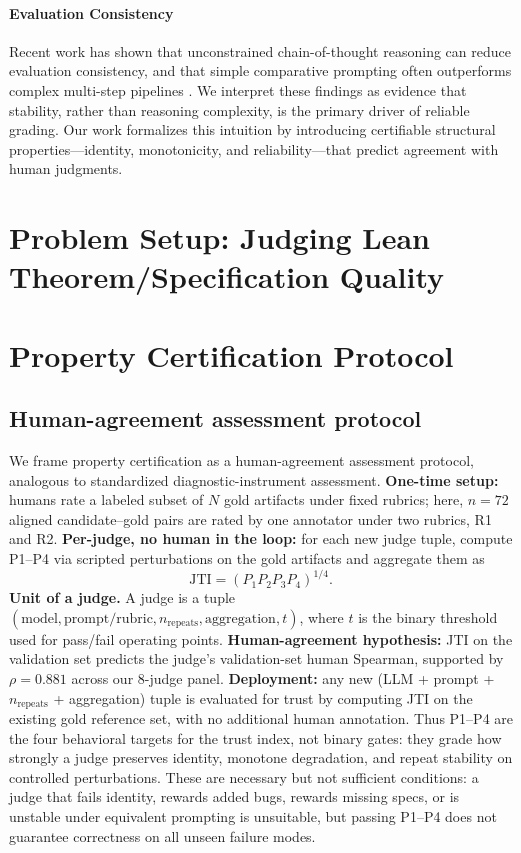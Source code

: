 \documentclass{article}
\begin{document}
\paragraph{Evaluation Consistency}

Recent work has shown that unconstrained chain-of-thought reasoning can reduce evaluation consistency, and that simple comparative prompting often outperforms complex multi-step pipelines \cite{chen2026rethinking}. We interpret these findings as evidence that stability, rather than reasoning complexity, is the primary driver of reliable grading. Our work formalizes this intuition by introducing certifiable structural properties---identity, monotonicity, and reliability---that predict agreement with human judgments.

\section{Problem Setup: Judging Lean Theorem/Specification Quality}

\section{Property Certification Protocol}
\subsection{Human-agreement assessment protocol}
We frame property certification as a human-agreement assessment protocol, analogous to standardized diagnostic-instrument assessment.
\textbf{One-time setup:} humans rate a labeled subset of \(N\) gold artifacts under fixed rubrics; here, \(n=72\) aligned candidate--gold pairs are rated by one annotator under two rubrics, R1 and R2.
\textbf{Per-judge, no human in the loop:} for each new judge tuple, compute P1--P4 via scripted perturbations on the gold artifacts and aggregate them as
\[
  \mathrm{JTI} = (P_1 P_2 P_3 P_4)^{1/4}.
\]
\textbf{Unit of a judge.} A judge is a tuple
\((\text{model}, \text{prompt/rubric}, n_\text{repeats}, \text{aggregation}, t)\),
where \(t\) is the binary threshold used for pass/fail operating points.
\textbf{Human-agreement hypothesis:} JTI on the validation set predicts the judge's validation-set human Spearman, supported by \(\rho=0.881\) across our \(8\)-judge panel.
\textbf{Deployment:} any new (LLM + prompt + \(n_\text{repeats}\) + aggregation) tuple is evaluated for trust by computing JTI on the existing gold reference set, with no additional human annotation.
Thus P1--P4 are the four behavioral targets for the trust index, not binary gates: they grade how strongly a judge preserves identity, monotone degradation, and repeat stability on controlled perturbations.
These are necessary but not sufficient conditions: a judge that fails identity, rewards added bugs, rewards missing specs, or is unstable under equivalent prompting is unsuitable, but passing P1--P4 does not guarantee correctness on all unseen failure modes.
\end{document}
